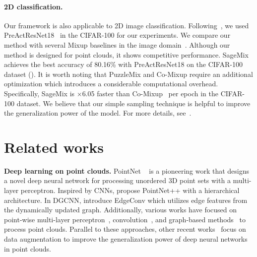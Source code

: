 \documentclass{article}
\begin{document}
 \paragraph{2D classification.}
Our framework is also applicable to 2D image classification. Following~\cite{DBLP:conf/iclr/KimCJS21}, we used PreActResNet18~\cite{he2016identity} in the CIFAR-100 for our experiments. 
We compare our method with several Mixup baselines in the image domain~\cite{kim2020puzzle, DBLP:conf/iclr/KimCJS21,  DBLP:conf/iclr/UddinMSCB21, verma2019manifold, DBLP:conf/iclr/ZhangCDL18, yun2019cutmix}. 
Although our method is designed for point clouds, it shows competitive performance. 
SageMix achieves the best accuracy of 80.16\% with PreActResNet18 on the CIFAR-100 dataset (). 
It is worth noting that PuzzleMix and Co-Mixup require an additional optimization which introduces a considerable computational overhead. 
Specifically, SageMix is $\times$6.05 faster than Co-Mixup~\cite{DBLP:conf/iclr/KimCJS21} per epoch in the CIFAR-100 dataset.
We believe that our simple sampling technique is helpful to improve the generalization power of the model. For more details, see~.
 \section{Related works}
\label{sec:rel}
\textbf{Deep learning on point clouds.}
PointNet ~\cite{qi2017pointnet} is a pioneering work that designs a novel deep neural network for processing unordered 3D point sets with a multi-layer perceptron. Inspired by CNNs, \citet{qi2017pointnet++} propose PointNet++ with a hierarchical architecture. In DGCNN, \citet{wang2019dynamic} introduce EdgeConv which utilizes edge features from the dynamically updated graph.
Additionally, various works have focused on point-wise multi-layer perceptron~\cite{joseph2019momen, yan2020pointasnl, zhao2019pointweb}, convolution~\cite{hua2018pointwise,   lan2019modeling,lei2019octree,li2018pointcnn,liu2019relation, thomas2019kpconv, wu2019pointconv}, and graph-based methods~\cite{shen2018mining, zhang2018graph} to process point clouds. Parallel to these approaches, other recent works~\cite{chen2020pointmixup, kim2021point, lee2021regularization,li2020pointaugment, yun2019cutmix} focus on data augmentation to improve the generalization power of deep neural networks in point clouds.
\end{document}

